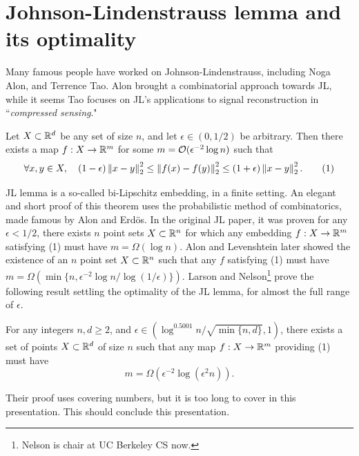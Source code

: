\documentclass[11pt]{article}
\begin{document}
  \section{Johnson-Lindenstrauss lemma and its optimality}
  Many famous people have worked on Johnson-Lindenstrauss, including Noga Alon, and Terrence Tao.
  Alon brought a combinatorial approach towards JL, while it seems Tao focuses on JL's applications to 
  signal reconstruction in ``\emph{compressed sensing}."
  \begin{theorem}
    Let $X \subset \mathbb{R}^d$ be any set of size $n$, and let $\epsilon \in (0,1/2)$ be arbitrary.
    Then there exists a map $f : X \to \mathbb{R}^m$ for some $m = \mathcal{O}(\epsilon^{-2}\log{n})$ such that
    \begin{equation*}
      \forall x,y\in X, \quad (1-\epsilon)\left\lVert x-y\right\rVert_2^2 \le \left\lVert f(x)-f(y)\right\rVert_2^2 \le (1+\epsilon)\left\lVert x-y\right\rVert_2^2.\tag{1}
    \end{equation*}
  \end{theorem}
  JL lemma is a so-called bi-Lipschitz embedding, in a finite setting. An elegant and short proof of
  this theorem uses the probabilistic
  method of combinatorics, made famous by Alon and Erd\"os.
  In the original JL paper, it was proven for any $\epsilon < 1/2$, there exists $n$ point sets
  $X\subset \mathbb{R}^n$ for which any embedding $f : X \to \mathbb{R}^m$ satisfying (1) must have
  $m = \Omega(\log{n})$. Alon and Levenshtein later showed the existence of an $n$ point
  set $X \subset \mathbb{R}^n$ such that any $f$ satisfying (1) must have 
  $m = \Omega(\min\{n, \epsilon^{-2}\log{n}/\log{(1/\epsilon)}\}).$
  Larson and Nelson\footnote{Nelson is chair at UC Berkeley CS now.} prove the following result settling the optimality
  of the JL lemma, for almost the full range of $\epsilon$.
  \begin{theorem}
    For any integers $n,d \ge 2$, and $\epsilon \in (\log^{0.5001}{n/ \sqrt{\min\{n,d\}}}, 1)$, there exists
    a set of points $X \subset \mathbb{R}^d$ of size $n$ such that any map $f : X \to \mathbb{R}^m$ providing (1)
    must have $$
    m = \Omega(\epsilon^{-2}\log(\epsilon^2n)).
    $$
  \end{theorem}
  Their proof uses covering numbers, but it is too long to cover in this presentation.
  This should conclude this presentation.
  \nocite{*}
  
  
\end{document}
